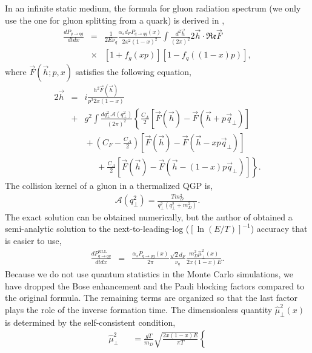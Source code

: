 \documentclass[aps, prc, reprint, amsmath, groupedaddress, nofootinbib]{revtex4-1}
\begin{document}
{In an infinite static medium, the formula for gluon radiation spectrum (we only use the one for gluon splitting from a quark) is derived in \cite{Arnold:2002zm,Arnold:2003zc},
\begin{eqnarray}\label{eq:AMY-1}
\nonumber
\frac{dP_{q\rightarrow qg}}{dt dx} &=& \frac{1}{2E\nu_q} \frac{\alpha_s d_F P_{q\rightarrow qg}(x)}{2x^2(1-x)^2}\int\frac{d^2\vec{h}}{(2\pi)^2}2\vec{h}\cdot \mathfrak{Re} \vec{F} \\
&\times& [1+f_g(xp)][1-f_q((1-x)p)],
\end{eqnarray}
where $\vec{F}(\vec{h}; p, x)$ satisfies the following equation,
\begin{eqnarray}\label{eq:AMY-2}
\nonumber
2\vec{h} &=& i\frac{h^2 \vec{F}(\vec{h})}{p^3 2x(1-x)} \\
\nonumber
&+& g^2\int \frac{dq_\perp^2 \mathcal{A}(q_\perp^2)}{(2\pi)^2}\left\{\frac{C_A}{2}\left[\vec{F}(\vec{h}) - \vec{F}(\vec{h}+p\vec{q}_\perp)\right]\right. \\
\nonumber
&& \phantom{} + \left(C_F - \frac{C_A}{2}\right)\left[\vec{F}(\vec{h}) - \vec{F}(\vec{h}-xp\vec{q}_\perp)\right] \\
&& \phantom{sss} + \left. \frac{C_A}{2}\left[\vec{F}(\vec{h}) - \vec{F}(\vec{h}-(1-x)p\vec{q}_\perp)\right] \right\}.
\end{eqnarray}
The collision kernel of a gluon in a thermalized QGP is,
\begin{eqnarray}
\mathcal{A}(q_\perp^2) = \frac{T m_D^2}{q_\perp^2(q_\perp^2+m_D^2)}.
\end{eqnarray}
The exact solution can be obtained numerically, but the author of \cite{Arnold:2008zu} obtained a semi-analytic solution to the next-to-leading-log ($[\ln(E/T)]^{-1}$) accuracy that is easier to use,
\begin{eqnarray}\label{eq:AMY-NLL}
\frac{dP_{q\rightarrow qg}^{\textrm{NLL}}}{dt dx} &=& \frac{\alpha_s P_{q\rightarrow qg}(x)}{2\pi}\frac{ \sqrt{2} d_F }{\nu_q }  \frac{m_D^2\hat{\mu}_\perp^2(x)}{2x(1-x)E}. 
\end{eqnarray}
Because we do not use quantum statistics in the Monte Carlo simulations, we have dropped the Bose enhancement and the Pauli blocking factors compared to the original formula.
The remaining terms are organized so that the last factor plays the role of the inverse formation time.
The dimensionless quantity $\hat{\mu}_\perp^2(x)$ is determined by the self-consistent condition,
\begin{eqnarray}\label{eq:AMY-sf}
\nonumber
\hat{\mu}_\perp^2 && = \frac{gT}{m_D} \sqrt{\frac{2x(1-x)E}{\pi T}}\left\{

\end{eqnarray}}
\end{document}
